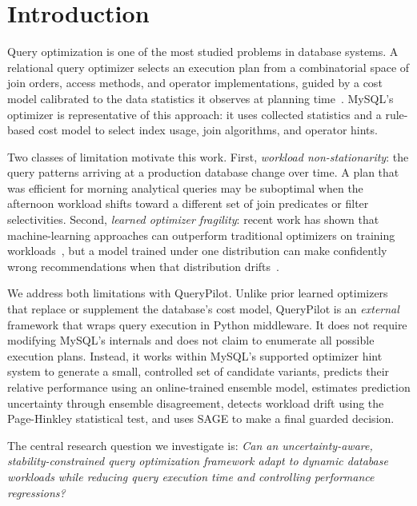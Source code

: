 \documentclass[conference]{IEEEtran}
\begin{document}
\section{Introduction}

Query optimization is one of the most studied problems in database systems.
A relational query optimizer selects an execution plan from a combinatorial
space of join orders, access methods, and operator implementations, guided by
a cost model calibrated to the data statistics it observes at planning
time~\cite{b1}. MySQL's optimizer is representative of this approach: it uses
collected statistics and a rule-based cost model to select index usage, join
algorithms, and operator hints.

Two classes of limitation motivate this work. First, \textit{workload
non-stationarity}: the query patterns arriving at a production database change
over time. A plan that was efficient for morning analytical queries may be
suboptimal when the afternoon workload shifts toward a different set of join
predicates or filter selectivities. Second, \textit{learned optimizer
fragility}: recent work has shown that machine-learning approaches can
outperform traditional optimizers on training workloads~\cite{b2,b3}, but
a model trained under one distribution can make confidently wrong
recommendations when that distribution drifts~\cite{b4}.

We address both limitations with QueryPilot. Unlike prior learned optimizers
that replace or supplement the database's cost model, QueryPilot is an
\textit{external} framework that wraps query execution in Python middleware.
It does not require modifying MySQL's internals and does not claim to enumerate
all possible execution plans. Instead, it works within MySQL's supported
optimizer hint system to generate a small, controlled set of candidate
variants, predicts their relative performance using an online-trained ensemble
model, estimates prediction uncertainty through ensemble disagreement, detects
workload drift using the Page-Hinkley statistical test, and uses SAGE to make
a final guarded decision.

The central research question we investigate is: \textit{Can an
uncertainty-aware, stability-constrained query optimization framework adapt to
dynamic database workloads while reducing query execution time and controlling
performance regressions?}
\end{document}
